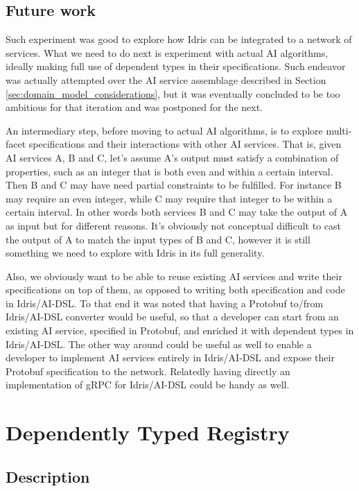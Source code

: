 \documentclass[]{report}
\begin{document}
\subsection{Future work}

Such experiment was good to explore how Idris can be integrated to a
network of services.  What we need to do next is experiment with
actual AI algorithms, ideally making full use of dependent types in
their specifications.  Such endeavor was actually attempted over the
AI service assemblage described in Section
\ref{sec:domain_model_considerations}, but it was eventually concluded to
be too ambitious for that iteration and was postponed for the next.

An intermediary step, before moving to actual AI algorithms, is to
explore multi-facet specifications and their interactions with other
AI services.  That is, given AI services A, B and C, let's assume A's
output must satisfy a combination of properties, such as an integer
that is both even and within a certain interval.  Then B and C may
have need partial constraints to be fulfilled.  For instance B may
require an even integer, while C may require that integer to be within
a certain interval.  In other words both services B and C may take the
output of A as input but for different reasons.  It's obviously not
conceptual difficult to cast the output of A to match the input types
of B and C, however it is still something we need to explore with
Idris in its full generality.

Also, we obviously want to be able to reuse existing AI services and
write their specifications on top of them, as opposed to writing both
specification and code in Idris/AI-DSL.  To that end it was noted that
having a Protobuf to/from Idris/AI-DSL converter would be useful, so
that a developer can start from an existing AI service, specified in
Protobuf, and enriched it with dependent types in Idris/AI-DSL.  The
other way around could be useful as well to enable a developer to
implement AI services entirely in Idris/AI-DSL and expose their
Protobuf specification to the network.  Relatedly having directly an
implementation of gRPC for Idris/AI-DSL could be handy as well.

\section{Dependently Typed Registry}
\label{sec:dependently_typed_registry}

\subsection{Description}
\end{document}
